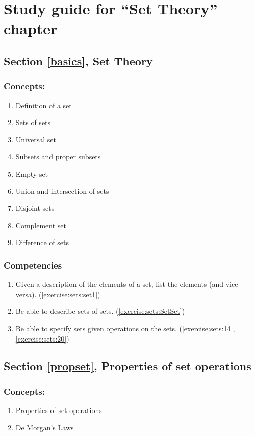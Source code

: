 \section{Study guide  for ``Set Theory''  chapter}
\label{sec:sets:study} 
\subsection*{Section \ref{basics}, Set Theory}
\subsubsection*{Concepts:}
\begin{enumerate}
\item 
Definition of a set
\item 
Sets of sets
\item 
Universal set
\item 
Subsets and proper subsets
\item 
Empty set
\item 
Union and intersection of sets
\item 
Disjoint sets
\item 
Complement set
\item 
Difference of sets
\end{enumerate}

\subsubsection*{Competencies}
\begin{enumerate}
\item
Given a description of the elements of a set, list the elements (and vice versa). (\ref{exercise:sets:set1}) 
\item
Be able to describe sets of sets. (\ref{exercise:sets:SetSet}) 
\item
Be able to specify sets given operations on the sets.  (\ref{exercise:sets:14}, \ref{exercise:sets:20})
\end{enumerate}


\subsection*{Section \ref{propset}, Properties of set operations}
\subsubsection*{Concepts:}
\begin{enumerate}
\item 
Properties of set operations
\item
De Morgan's Laws
\end{enumerate}

